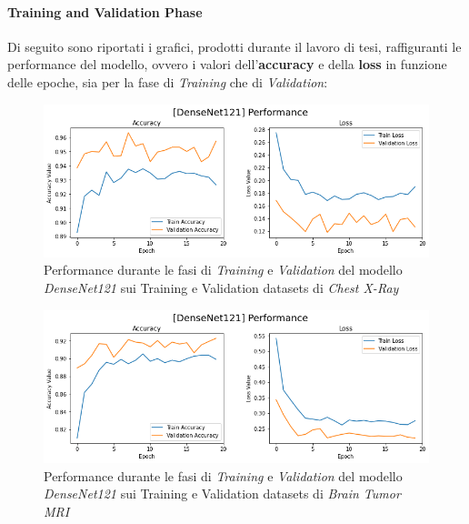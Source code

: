         \paragraph{Training and Validation Phase} 
        Di seguito sono riportati i grafici, prodotti durante il lavoro di tesi, raffiguranti le performance del modello, ovvero i valori dell'\textbf{accuracy} e della \textbf{loss} in funzione delle epoche, sia per la fase di \textit{Training} che di \textit{Validation}:
            \begin{figure}[!h]
                \centering
                \includegraphics [width=\textwidth]{Images/Modelli/DenseNet121/DenseNet121 Pneumonia Performance.png}
                \caption{Performance durante le fasi di \textit{Training} e \textit{Validation} del modello \textit{DenseNet121} sui Training e Validation datasets di \textit{Chest X-Ray}}
                \label{DenseNet121 Pneumonia Performance}
            \end{figure}
            
            \begin{figure}[!h]
                \centering
                \includegraphics [width=\textwidth]{Images/Modelli/DenseNet121/DenseNet121 Brain Performance.png}
                \caption{Performance durante le fasi di \textit{Training} e \textit{Validation} del modello \textit{DenseNet121} sui Training e Validation datasets di \textit{Brain Tumor MRI}}
                \label{DenseNet121 Brain Performance}
            \end{figure}
        
